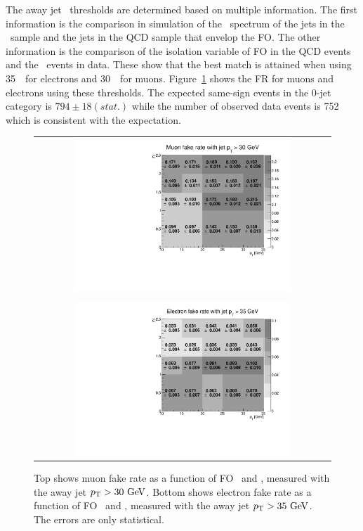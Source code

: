 The away jet \pt\ thresholds are determined based on multiple information.  
The first information is the comparison in simulation 
of the \pt\ spectrum of the jets in the \Wjets\ 
sample and the jets in the QCD sample that envelop the FO. The other information 
is the comparison of the isolation variable of FO in the QCD events and the \Wjets\ 
events in data. These show that the best match is attained when  
using 35~\GeV\ for electrons and 30~\GeV\ for muons. 
Figure~\ref{fig:2DFR} shows the FR for muons and electrons using these thresholds. 
The expected same-sign events in the 0-jet category  
is $794\pm18(stat.)$ while the number of observed data events is 752 which 
is consistent with the expectation.
\begin{figure}[htp] 
\centering 
\begin{tabular}{c} 
\includegraphics[width=0.75\textwidth]{figures/2DFR_Muon_jet30.pdf} \\
\\
\includegraphics[width=0.75\textwidth]{figures/2DFR_Electron_jet35.pdf}
\end{tabular} 
\caption{Top shows muon fake rate as a function of FO \pt\ and \Eta, 
measured with the away jet $p_\mathrm{T}>30~\mathrm{Ge\kern -0.1em V}$.  
Bottom shows electron fake rate as a function of FO \pt\ and \Eta,
measured with the away jet $p_\mathrm{T}>35~\mathrm{Ge\kern -0.1em V}$.
The errors are only statistical.}
\label{fig:2DFR} 
\end{figure} 


